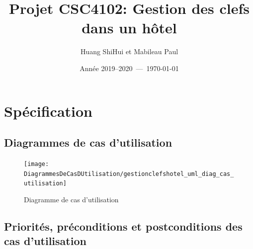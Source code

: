 \documentclass[11pt,article]{article}
\begin{document}
\title{Projet CSC4102: Gestion des clefs dans un hôtel}
\author{Huang ShiHui et Mabileau Paul}
\date{Année 2019--2020~---~\today}
\maketitle

\newpage

\tableofcontents

\newpage

\section{Spécification}

\subsection{Diagrammes de cas d'utilisation}

\begin{figure}[h!]
  \texttt{[image: DiagrammesDeCasDUtilisation/gestionclefshotel\_uml\_diag\_cas\_utilisation]}
  \caption{Diagramme de cas d'utilisation}
  \label{umlet_diag_cas_utilisation}
\end{figure}

\newpage

\subsection{Priorités, préconditions et postconditions des cas d'utilisation}
\end{document}
